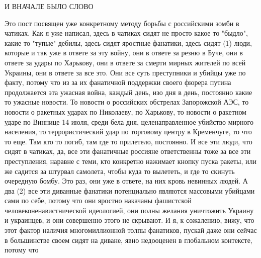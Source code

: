  
 
 
 
 

И ВНАЧАЛЕ БЫЛО СЛОВО

Это пост посвящен уже конкретному методу борьбы с российскими зомби в чатиках.
Как я уже написал, здесь в чатиках сидят не просто какое то "быдло", какие то
"тупые" дебилы, здесь сидят яростные фанатики, здесь сидят (1) люди, которые и
так уже в ответе за эту войну, они в ответе за резню в Буче, они в ответе за
удары по Харькову, они в ответе за смерти мирных жителей по всей Украины, они в
ответе за все это. Они все суть преступники и убийцы уже по факту, потому что
из за их фанатичной поддержки своего фюрера путина продолжается эта ужасная
война, каждый день, изо дня в день, постоянно какие то ужасные новости. То
новости о российских обстрелах Запорожской АЭС, то новости о ракетных ударах по
Николаеву, по Харькову, то новости о ракетном ударе по Виннице 14 июля, среди
бела дня, целенаправленное убийство мирного населения, то террористический удар
по торговому центру в Кременчуге, то что то еще.  Там кто то погиб, там где то
прилетело, постоянно. И все эти люди, что сидят в чатиках, да, все эти
фанатичные россияне ответственны тоже за все эти преступления, наравне с теми,
кто конкретно нажимает кнопку пуска ракеты, или же садится за штурвал самолета,
чтобы куда то вылететь, и где то скинуть очередную бомбу. Это раз, они уже в
ответе, на них кровь невинных людей.  А два (2) все эти диванные фанатики
потенциально являются массовыми убийцами сами по себе, потому что они яростно
накачаны фашистской человеконенавистнической идеологией, они полны желания
уничтожить Украину и украинцев, и они совершенно этого не скрывают. И я, к
сожалению, вижу, что этот фактор наличия многомиллионной толпы фанатиков,
пускай даже они сейчас в большинстве своем сидят на диване, явно недооценен в
глобальном контексте, потому что

